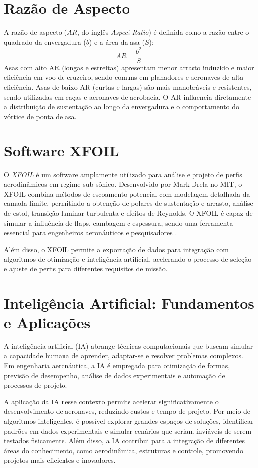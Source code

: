 \section{Razão de Aspecto}
A razão de aspecto (\(AR\), do inglês \textit{Aspect Ratio}) é definida como a razão entre o quadrado da envergadura (\(b\)) e a área da asa (\(S\)):
\[
AR = \frac{b^2}{S}
\]
Asas com alto AR (longas e estreitas) apresentam menor arrasto induzido e maior eficiência em voo de cruzeiro, sendo comuns em planadores e aeronaves de alta eficiência. Asas de baixo AR (curtas e largas) são mais manobráveis e resistentes, sendo utilizadas em caças e aeronaves de acrobacia. O AR influencia diretamente a distribuição de sustentação ao longo da envergadura e o comportamento do vórtice de ponta de asa.

\section{Software XFOIL}
O \textit{XFOIL} é um software amplamente utilizado para análise e projeto de perfis aerodinâmicos em regime sub-sônico. Desenvolvido por Mark Drela no MIT, o XFOIL combina métodos de escoamento potencial com modelagem detalhada da camada limite, permitindo a obtenção de polares de sustentação e arrasto, análise de estol, transição laminar-turbulenta e efeitos de Reynolds. O XFOIL é capaz de simular a influência de flaps, cambagem e espessura, sendo uma ferramenta essencial para engenheiros aeronáuticos e pesquisadores \cite{drela1989xfoil}.

Além disso, o XFOIL permite a exportação de dados para integração com algoritmos de otimização e inteligência artificial, acelerando o processo de seleção e ajuste de perfis para diferentes requisitos de missão.

\section{Inteligência Artificial: Fundamentos e Aplicações}
A inteligência artificial (IA) abrange técnicas computacionais que buscam simular a capacidade humana de aprender, adaptar-se e resolver problemas complexos. Em engenharia aeronáutica, a IA é empregada para otimização de formas, previsão de desempenho, análise de dados experimentais e automação de processos de projeto.

A aplicação da IA nesse contexto permite acelerar significativamente o desenvolvimento de aeronaves, reduzindo custos e tempo de projeto. Por meio de algoritmos inteligentes, é possível explorar grandes espaços de soluções, identificar padrões em dados experimentais e simular cenários que seriam inviáveis de serem testados fisicamente. Além disso, a IA contribui para a integração de diferentes áreas do conhecimento, como aerodinâmica, estruturas e controle, promovendo projetos mais eficientes e inovadores.

